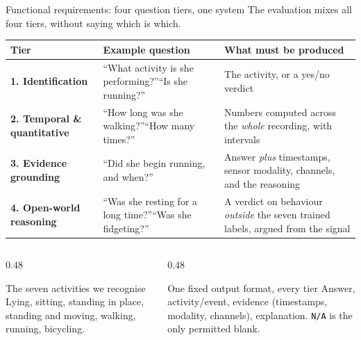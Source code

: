 \documentclass[aspectratio=169,11pt]{beamer}
\newcommand{\code}[1]{\texttt{\small #1}}
\begin{document}
\begin{frame}{Functional requirements: four question tiers, one system}
  \footnotesize
  The evaluation mixes all four tiers, without saying which is which.
  \smallskip

  {\scriptsize\renewcommand{\arraystretch}{1.2}
  \begin{tabular}{@{}>{\raggedright\arraybackslash}p{}
                    >{\raggedright\arraybackslash}p{}
                    >{\raggedright\arraybackslash}p{}@{}}
    \toprule
    \textbf{Tier} & \textbf{Example question} & \textbf{What must be produced} \\
    \midrule
    \textbf{1. Identification} &
    ``What activity is she performing?''\newline ``Is she running?'' &
    The activity, or a yes/no verdict \\[0.35em]
    \textbf{2. Temporal \& quantitative} &
    ``How long was she walking?''\newline ``How many times?'' &
    Numbers computed across the \emph{whole} recording, with intervals \\[0.35em]
    \textbf{3. Evidence grounding} &
    ``Did she begin running, and when?'' &
    Answer \emph{plus} timestamps, sensor modality, channels, and the reasoning \\[0.35em]
    \textbf{4. Open-world reasoning} &
    ``Was she resting for a long time?''\newline ``Was she fidgeting?'' &
    A verdict on behaviour \emph{outside} the seven trained labels, argued from the signal \\
    \bottomrule
  \end{tabular}}

  \smallskip
  \begin{columns}[T,onlytextwidth]
    \begin{column}{0.48\textwidth}
      \begin{block}{The seven activities we recognise}
        Lying, sitting, standing in place, standing and moving, walking,
        running, bicycling.
      \end{block}
    \end{column}
    \begin{column}{0.48\textwidth}
      \begin{block}{One fixed output format, every tier}
        Answer, activity/event, evidence (timestamps, modality, channels),
        explanation. \code{N/A} is the only permitted blank.
      \end{block}
    \end{column}
  \end{columns}
\end{frame}
\end{document}
